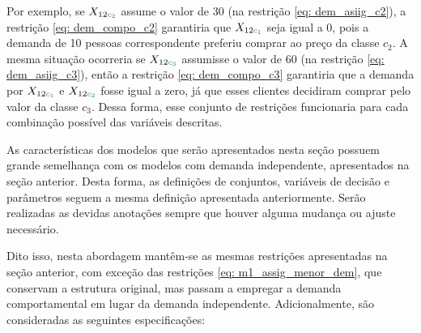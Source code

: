 Por exemplo, se $X_{12\textcolor[rgb]{0.0588, 0.5412, 0.4275}{c_2}}$ assume o valor de 30 (na restrição \ref{eq: dem_asiig_c2}), a restrição \eqref{eq: dem_compo_c2} garantiria que $X_{12\textcolor[rgb]{0.0588, 0.5412, 0.4275}{c_1}}$ seja igual a 0, pois a demanda de 10 pessoas correspondente preferiu comprar ao preço da classe $c_2$. A mesma situação ocorreria se $X_{12\textcolor[rgb]{0.0588, 0.5412, 0.4275}{c_3}}$ assumisse o valor de 60 (na restrição \ref{eq: dem_asiig_c3}), então a restrição \eqref{eq: dem_compo_c3} garantiria que a demanda por $X_{12\textcolor[rgb]{0.0588, 0.5412, 0.4275}{c_1}}$ e $X_{12\textcolor[rgb]{0.0588, 0.5412, 0.4275}{c_2}}$ fosse igual a zero, já que esses clientes decidiram comprar pelo valor da classe $c_3$. Dessa forma, esse conjunto de restrições funcionaria para cada combinação possível das variáveis descritas.

As características dos modelos que serão apresentados nesta seção possuem grande semelhança com os modelos com demanda independente, apresentados na seção anterior. Desta forma, as definições de conjuntos, variáveis de decisão e parâmetros seguem a mesma definição apresentada anteriormente. Serão realizadas as devidas anotações sempre que houver alguma mudança ou ajuste necessário.



Dito isso, nesta abordagem mantêm-se as mesmas restrições apresentadas na seção anterior, com exceção das restrições \eqref{eq: m1_assig_menor_dem}, que conservam a estrutura original, mas passam a empregar a demanda comportamental em lugar da demanda independente. Adicionalmente, são consideradas as seguintes especificações:

